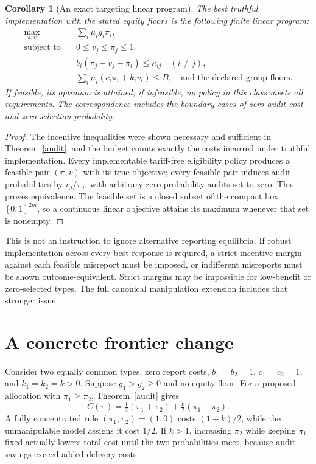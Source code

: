\documentclass[11pt]{article}
\newtheorem{corollary}[theorem]{Corollary}
\theoremstyle{remark}
\begin{document}
\begin{corollary}[An exact targeting linear program]\label{lp}
The best truthful implementation with the stated equity floors is the following finite linear program:
\begin{align*}
 \max_{\pi,v}\quad&\sum_i\mu_ig_i\pi_i,\\
 \text{subject to}\quad&0\leq v_j\leq\pi_j\leq1,\\
 &b_i(\pi_j-v_j-\pi_i)\leq\kappa_{ij}\quad(i\ne j),\\
 &\sum_i\mu_i(c_i\pi_i+k_iv_i)\leq B,
 \quad\text{and the declared group floors.}
\end{align*}
If feasible, its optimum is attained; if infeasible, no policy in this class meets all requirements. The correspondence includes the boundary cases of zero audit cost and zero selection probability.
\end{corollary}
\begin{proof}
The incentive inequalities were shown necessary and sufficient in Theorem~\ref{audit}, and the budget counts exactly the costs incurred under truthful implementation. Every implementable tariff-free eligibility policy produces a feasible pair $(\pi,v)$ with its true objective; every feasible pair induces audit probabilities by $v_j/\pi_j$, with arbitrary zero-probability audits set to zero. This proves equivalence. The feasible set is a closed subset of the compact box $[0,1]^{2m}$, so a continuous linear objective attains its maximum whenever that set is nonempty.
\end{proof}

This is not an instruction to ignore alternative reporting equilibria. If robust implementation across every best response is required, a strict incentive margin against each feasible misreport must be imposed, or indifferent misreports must be shown outcome-equivalent. Strict margins may be impossible for low-benefit or zero-selected types. The full canonical manipulation extension includes that stronger issue.

\section{A concrete frontier change}
Consider two equally common types, zero report costs, $b_1=b_2=1$, $c_1=c_2=1$, and $k_1=k_2=k>0$. Suppose $g_1>g_2\geq0$ and no equity floor. For a proposed allocation with $\pi_1\geq\pi_2$, Theorem~\ref{audit} gives
\[
 C(\pi)=\tfrac12(\pi_1+\pi_2)+\tfrac{k}{2}(\pi_1-\pi_2).
\]
A fully concentrated rule $(\pi_1,\pi_2)=(1,0)$ costs $(1+k)/2$, while the unmanipulable model assigns it cost $1/2$. If $k>1$, increasing $\pi_2$ while keeping $\pi_1$ fixed actually lowers total cost until the two probabilities meet, because audit savings exceed added delivery costs.
\end{document}
